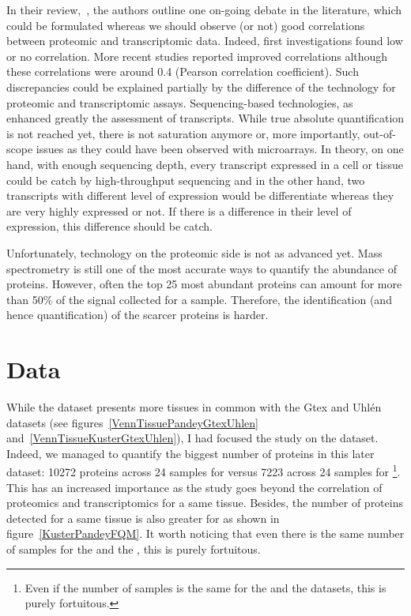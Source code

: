 In their review,~\cite{Uhlen:2016}, the authors outline one on-going debate
in the literature, which could be formulated whereas we should observe (or not) good
correlations between proteomic and transcriptomic data.
Indeed, first investigations found low or no correlation. More recent
studies reported improved correlations although these correlations were around
0.4 (Pearson correlation coefficient). Such discrepancies could be explained
partially by the difference of the technology for proteomic and transcriptomic
assays. Sequencing-based technologies, as \Rnaseq\, enhanced greatly the assessment
of transcripts. While true absolute quantification is not reached yet, there is
not saturation anymore or, more importantly, out-of-scope issues as they could
have been observed with microarrays. In theory, on one hand, with enough
sequencing depth, every transcript expressed in a cell or tissue could be catch
by high-throughput sequencing and in the other hand, two transcripts with different
level of expression would be differentiate  whereas they are very highly expressed
or not. If there is a difference in their level of expression, this difference
should be catch.

Unfortunately, technology on the proteomic side is not as advanced yet.
Mass spectrometry is still one of the most accurate ways to quantify the abundance
of proteins. However, often the top 25 most abundant proteins can amount for more
than 50\% of the signal collected for a sample. Therefore, the identification (and
hence quantification) of the scarcer proteins is harder.


\section{Data}
\label{sec:IntegrationResults}
While the  dataset presents more tissues in common
with the Gtex and Uhlén datasets (see figures~\ref{VennTissuePandeyGtexUhlen}
and~\ref{VennTissueKusterGtexUhlen}), I had focused the study on
the  dataset. Indeed, we managed to quantify the biggest number
of proteins in this later dataset: 10272 proteins across 24 samples for
 versus 7223 across 24 samples for \footnote{Even
if the number of samples is the same for the  and
the  datasets, this is purely fortuitous.}.
This has an increased importance as the study goes beyond the correlation of
proteomics and transcriptomics for a same tissue. Besides, the number of proteins
detected for a same tissue is also greater for  as shown
in figure~\ref{KusterPandeyFQM}.
It worth noticing that even there is the same number of samples for the
 and the , this is purely fortuitous.

